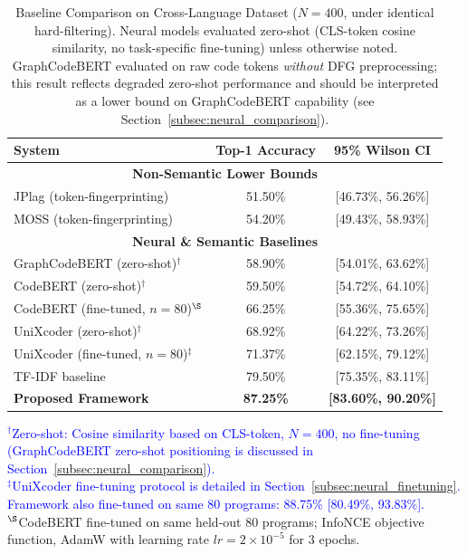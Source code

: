 \begin{table}[ht]
\caption{Baseline Comparison on Cross-Language Dataset ($N=400$, under identical hard-filtering). Neural models evaluated zero-shot (CLS-token cosine similarity, no task-specific fine-tuning) unless otherwise noted. GraphCodeBERT evaluated on raw code tokens \textit{without} DFG preprocessing; this result reflects degraded zero-shot performance and should be interpreted as a lower bound on GraphCodeBERT capability (see Section~\ref{subsec:neural_comparison}).}
\label{tab:baseline_comparison}
\centering
\begin{tabular}{|l|c|c|}
\hline
\textbf{System} & \textbf{Top-1 Accuracy} & \textbf{95\% Wilson CI} \\
\hline
\multicolumn{3}{|c|}{\cellcolor{gray!20}\textbf{Non-Semantic Lower Bounds}} \\
\hline
JPlag (token-fingerprinting)  & 51.50\% & [46.73\%, 56.26\%] \\
MOSS (token-fingerprinting)   & 54.20\% & [49.43\%, 58.93\%] \\
\hline
\multicolumn{3}{|c|}{\cellcolor{gray!20}\textbf{Neural \& Semantic Baselines}} \\
\hline
GraphCodeBERT (zero-shot)$^{\dagger}$         & 58.90\% & [54.01\%, 63.62\%] \\
CodeBERT (zero-shot)$^{\dagger}$               & 59.50\% & [54.72\%, 64.10\%] \\
CodeBERT (fine-tuned, $n{=}80$)$^{\S}$        & 66.25\% & [55.36\%, 75.65\%] \\
UniXcoder (zero-shot)$^{\dagger}$             & 68.92\% & [64.22\%, 73.26\%] \\
UniXcoder (fine-tuned, $n{=}80$)$^{\ddagger}$ & 71.37\% & [62.15\%, 79.12\%] \\
TF-IDF baseline                               & 79.50\% & [75.35\%, 83.11\%] \\
\textbf{Proposed Framework}                   & \textbf{87.25\%} & \textbf{[83.60\%, 90.20\%]} \\
\hline
\end{tabular}
\begin{flushleft}
\footnotesize
\textcolor{blue}{$^{\dagger}$Zero-shot: Cosine similarity based on CLS-token, $N=400$, no fine-tuning (GraphCodeBERT zero-shot positioning is discussed in Section~\ref{subsec:neural_comparison}).}\\
\textcolor{blue}{$^{\ddagger}$UniXcoder fine-tuning protocol is detailed in Section~\ref{subsec:neural_finetuning}. Framework also fine-tuned on same 80 programs: 88.75\% [80.49\%, 93.83\%].}\\
$^{\S}$CodeBERT fine-tuned on same held-out 80 programs; InfoNCE objective function, AdamW with learning rate $lr{=}2{\times}10^{-5}$ for 3 epochs.
\end{flushleft}
\end{table}

